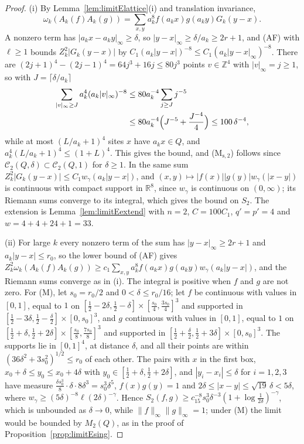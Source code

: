 \documentclass[aps,prd,twocolumn,superscriptaddress,nofootinbib,longbibliography,floatfix,amsmath,amssymb,10pt]{revtex4-2}
\theoremstyle{definition}
\theoremstyle{remark}
\newcommand{\R}{\mathbb{R}}
\newcommand{\Z}{\mathbb{Z}}
\begin{document}
\begin{proof}
(i) By Lemma~\ref{lem:limitElattice}(i) and translation invariance,
\[
\omega_k(A_k(f)A_k(g))=\sum_{x,y}a_k^8f(a_kx)g(a_ky)G_k(y-x).
\]
A nonzero
term has $|a_kx-a_ky|_\infty\ge\delta$, so $|y-x|_\infty\ge\delta/a_k\ge
2r+1$, and (AF) with $\ell\ge1$ bounds $Z_k^2|G_k(y-x)|$ by $C_1(a_k|y-x|)
^{-8}\le C_1(a_k|y-x|_\infty)^{-8}$. There are $(2j+1)^4-(2j-1)^4=64j^3+16j
\le80j^3$ points $v\in\Z^4$ with $|v|_\infty=j\ge1$, so with $J=\lceil
\delta/a_k\rceil$
\[
\begin{aligned}
\sum_{|v|_\infty\ge J}a_k^4(a_k|v|_\infty)^{-8}&\le80a_k^{-4}\sum_{j\ge J}
j^{-5}\\
&\le80a_k^{-4}\Bigl(J^{-5}+\frac{J^{-4}}4\Bigr)\le100\,\delta^{-4},
\end{aligned}
\]
while at most $(L/a_k+1)^4$ sites $x$ have $a_kx\in Q$, and $a_k^4(L/a_k+1)
^4\le(1+L)^4$. This gives the bound, and (M$_{\mathrm s,2}$) follows since
$\mathcal C_2(Q,\delta)\subset\mathcal C_2(Q,1)$ for $\delta\ge1$. In the
same sum $Z_k^2|G_k(y-x)|\le C_1w_\gamma(a_k|y-x|)$, and $(x,y)\mapsto|f(x)|
|g(y)|w_\gamma(|x-y|)$ is continuous with compact support in $\R^8$, since
$w_\gamma$ is continuous on $(0,\infty)$; its Riemann sums converge to its
integral, which gives the bound on $S_2$. The extension is
Lemma~\ref{lem:limitEextend} with $n=2$, $C=100C_1$, $q'=p'=4$ and
$w=4+4+24+1=33$.

(ii) For large $k$ every nonzero term of the sum has $|y-x|_\infty\ge2r+1$
and $a_k|y-x|\le r_0$, so the lower bound of (AF) gives $Z_k^2\omega_k(A_k(
f)A_k(g))\ge c_1\sum_{x,y}a_k^8f(a_kx)g(a_ky)w_\gamma(a_k|y-x|)$, and the
Riemann sums converge as in (i). The integral is positive when $f$ and $g$
are not zero. For (M), let $s_0=r_0/2$ and $0<\delta\le r_0/16$; let $f$ be
continuous with values in $[0,1]$, equal to $1$ on $[\frac12-2\delta,
\frac12-\delta]\times[\frac{s_0}4,\frac{3s_0}4]^3$ and supported in
$[\frac12-3\delta,\frac12-\frac\delta2]\times[0,s_0]^3$, and $g$ continuous
with values in $[0,1]$, equal to $1$ on $[\frac12+\delta,\frac12+2\delta]
\times[\frac{s_0}8,\frac{7s_0}8]^3$ and supported in $[\frac12+\frac\delta2,
\frac12+3\delta]\times[0,s_0]^3$. The supports lie in $[0,1]^4$, at distance
$\delta$, and all their points are within $(36\delta^2+3s_0^2)^{1/2}\le r_0$
of each other. The pairs with $x$ in the first box, $x_0+\delta\le y_0\le
x_0+4\delta$ with $y_0\in[\frac12+\delta,\frac12+2\delta]$, and $|y_i-x_i|
\le\delta$ for $i=1,2,3$ have measure $\frac{\delta s_0^3}8\cdot\delta\cdot
8\delta^3=s_0^3\delta^5$, $f(x)g(y)=1$ and $2\delta\le|x-y|\le\sqrt{19}\,
\delta<5\delta$, where $w_\gamma\ge(5\delta)^{-8}\ell(2\delta)^{-\gamma}$.
Hence $S_2(f,g)\ge c_15^{-8}s_0^3\delta^{-3}(1+\log\frac1{2\delta})^{-\gamma}$,
which is unbounded as $\delta\to0$, while $\|f\|_\infty\|g\|_\infty=1$; under
(M) the limit would be bounded by $M_2(Q)$, as in the proof of
Proposition~\ref{prop:limitEsing}.


\end{proof}
\end{document}
